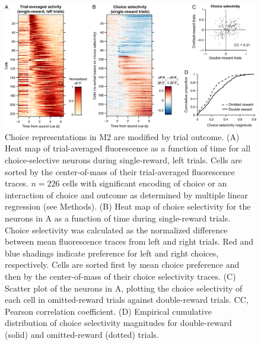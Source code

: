 \begin{figure}[htbp]

\begin{center}
\includegraphics[width=\textwidth]{Figures/CC_fig5.png} 
\end{center}

\caption[Choice representations were modified by trial outcome.]
{Choice representations in M2 are modified by trial outcome. (A) Heat map of trial-averaged fluorescence as a function of time for all choice-selective neurons during single-reward, left trials. Cells are sorted by the center-of-mass of their trial-averaged fluorescence traces. $n = 226$ cells with significant encoding of choice or an interaction of choice and outcome as determined by multiple linear regression (see Methods). (B) Heat map of choice selectivity for the neurons in A as a function of time during single-reward trials. Choice selectivity was calculated as the normalized difference between mean fluorescence traces from left and right trials. Red and blue shadings indicate preference for left and right choices, respectively. Cells are sorted first by mean choice preference and then by the center-of-mass of their choice selectivity traces. (C) Scatter plot of the neurons in A, plotting the choice selectivity of each cell in omitted-reward trials against double-reward trials. CC, Pearson correlation coefficient. (D) Empirical cumulative distribution of choice selectivity magnitudes for double-reward (solid) and omitted-reward (dotted) trials.}

\label{fig:CC_fig5}
\end{figure}